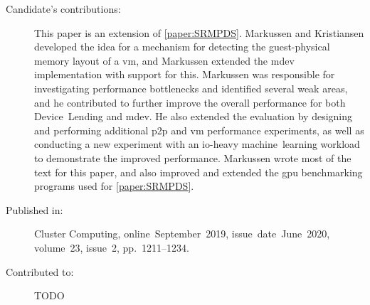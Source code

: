 \begin{description}
	\item[Candidate's contributions:]
		This paper is an extension of \cref{paper:SRMPDS}.
		Markussen and Kristiansen developed the idea for a mechanism for detecting the guest-physical memory layout of a \acrshort{vm}, and Markussen
		extended the \acrshort{mdev} implementation with support for this.
		Markussen was responsible for investigating performance bottlenecks and identified several weak areas,
		and he contributed to further improve the overall performance for both Device~Lending and \acrshort{mdev}.
		He also extended the evaluation by designing and performing additional \acrshort{p2p} and \acrshort{vm} performance experiments,
		as well as conducting a new experiment with an \gls{io}-heavy machine~learning workload 
		to demonstrate the improved performance.
		Markussen wrote most of the text for this paper, and also improved and extended the \acrshort{gpu} benchmarking programs used
		for \cref{paper:SRMPDS}.


	\item[Published in:]
		Cluster Computing,
		online~September~2019,
		issue~date~June~2020, 
		volume~23, issue~2, pp.~1211--1234.

	\item[Contributed to:]
		TODO

\end{description}
